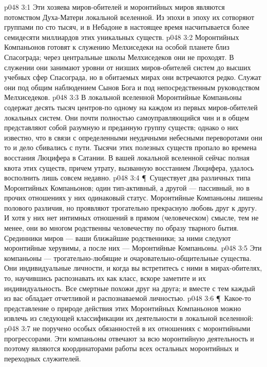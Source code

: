 \vs p048 3:1 Эти хозяева миров\hyp{}обителей и моронтийных миров являются потомством Духа\hyp{}Матери локальной вселенной. Из эпохи в эпоху их сотворяют группами по сто тысяч, и в Небадоне в настоящее время насчитывается более семидесяти миллиардов этих уникальных существ.
\vs p048 3:2 Моронтийных Компаньонов готовят к служению Мелхиседеки на особой планете близ Спасограда; через центральные школы Мелхиседеков они не проходят. В служении они занимают уровни от низших миров\hyp{}обителей систем до высших учебных сфер Спасограда, но в обитаемых мирах они встречаются редко. Служат они под общим наблюдением Сынов Бога и под непосредственным руководством Мелхиседеков.
\vs p048 3:3 В локальной вселенной Моронтийные Компаньоны содержат десять тысяч центров\hyp{}по одному на каждом из первых миров\hyp{}обителей локальных систем. Они почти полностью самоуправляющийся чин и в общем представляют собой разумную и преданную группу существ; однако о них известно, что в связи с определенными неудачными небесными переворотами они то и дело сбивались с пути. Тысячи этих полезных существ пропало во времена восстания Люцифера в Сатании. В вашей локальной вселенной сейчас полная квота этих существ, причем утрату, вызванную восстанием Люцифера, удалось восполнить лишь совсем недавно.
\vs p048 3:4 \P\ Существует два различных типа Моронтийных Компаньонов; один тип\hyp{}активный, а другой --- пассивный, но в прочих отношениях у них одинаковый статус. Моронтийные Компаньоны лишены полового различия, но проявляют трогательно прекрасную любовь друг к другу. И хотя у них нет интимных отношений в прямом (человеческом) смысле, тем не менее, они во многом родственны человечеству по образу тварного бытия. Срединники миров --- ваши ближайшие родственники; за ними следуют моронтийные херувимы, а после них --- Моронтийные Компаньоны.
\vs p048 3:5 Эти компаньоны --- трогательно\hyp{}любящие и очаровательно\hyp{}общительные существа. Они индивидуальные личности, и когда вы встретитесь с ними в мирах\hyp{}обителях, то, научившись распознавать их как класс, вскоре заметите и их индивидуальность. Все смертные похожи друг на друга; и вместе с тем каждый из вас обладает отчетливой и распознаваемой личностью.
\vs p048 3:6 \P\ Какое\hyp{}то представление о природе действия этих Моронтийных Компаньонов можно извлечь из следующей классификации их деятельности в локальной вселенной:
\vs p048 3:7 \bibnobreakspace {} не поручено особых обязанностей в их отношениях с моронтийными прогрессорами. Эти компаньоны отвечают за всю моронтийную деятельность и поэтому являются координаторами работы всех остальных моронтийных и переходных служителей.

